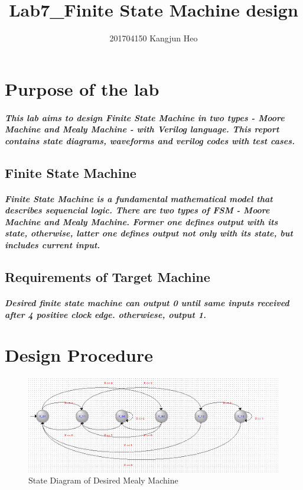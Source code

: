 \documentclass{report}
\title{Lab7\_Finite State Machine design}
\author{201704150 Kangjun Heo}
\begin{document}
    \maketitle
    \tableofcontents

    \chapter{Purpose of the lab}

        \paragraph{This lab aims to design Finite State Machine in two types - Moore Machine and Mealy Machine - with Verilog language. This report contains state diagrams, waveforms and verilog codes with test cases.}
    
        \section{Finite State Machine}

        \paragraph{\normalfont Finite State Machine is a fundamental mathematical model that describes sequencial logic. There are two types of FSM - Moore Machine and Mealy Machine. Former one defines output with its state, otherwise, latter one defines output not only with its state, but includes current input.}

        \section{Requirements of Target Machine}

        \paragraph{\normalfont Desired finite state machine can output 0 until same inputs received after 4 positive clock edge. otherwiese, output 1.}
    \chapter{Design Procedure}

        \begin{figure}[!htb]
            \centering
            \includegraphics[width=\textwidth]{diagrams/mealy_statediagram.PNG}
            \caption{State Diagram of Desired Mealy Machine}
        \end{figure}
\end{document}
